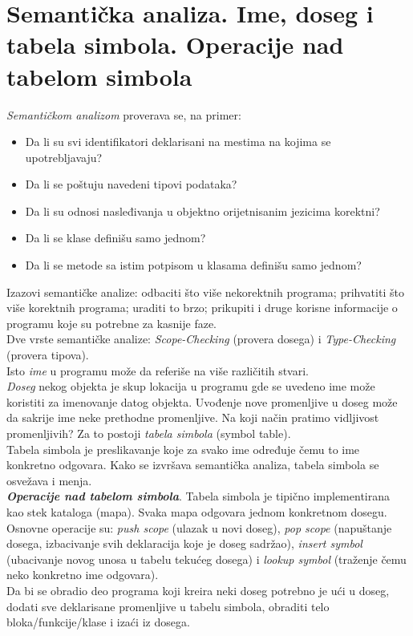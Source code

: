 \documentclass[10pt]{extarticle}
\begin{document}
\section{Semantička analiza. Ime, doseg i tabela simbola. Operacije nad tabelom simbola}
\noindent
\textit{Semantičkom analizom} proverava se, na primer:
\begin{itemize}
    \item Da li su svi identifikatori deklarisani na mestima na kojima se upotrebljavaju?
    \item Da li se poštuju navedeni tipovi podataka?
    \item Da li su odnosi nasleđivanja u objektno orijetnisanim jezicima korektni?
    \item Da li se klase definišu samo jednom?
    \item Da li se metode sa istim potpisom u klasama definišu samo jednom?
\end{itemize}
Izazovi semantičke analize: odbaciti što više nekorektnih programa; prihvatiti što više korektnih programa; uraditi to brzo; prikupiti i druge korisne informacije o programu koje su potrebne za kasnije faze. \\
Dve vrste semantičke analize: \textit{Scope-Checking} (provera dosega) i \textit{Type-Checking} (provera tipova). \\
Isto \textit{ime} u programu može da referiše na više različitih stvari. \\
\textit{Doseg} nekog objekta je skup lokacija u programu gde se uvedeno ime može koristiti za imenovanje datog objekta. Uvođenje nove promenljive u doseg može da sakrije 
ime neke prethodne promenljive. Na koji način pratimo vidljivost promenljivih?
Za to postoji \textit{tabela simbola} (symbol table). \\
Tabela simbola je preslikavanje koje za svako ime određuje čemu to ime konkretno odgovara. Kako se izvršava semantička analiza, tabela simbola se osvežava i menja. \\
\textit{\textbf{Operacije nad tabelom simbola}}. Tabela simbola je tipično implementirana kao stek kataloga (mapa). Svaka mapa odgovara jednom konkretnom dosegu. Osnovne operacije su: \textit{push scope} (ulazak u novi doseg), \textit{pop scope} (napuštanje dosega, izbacivanje svih deklaracija koje je doseg sadržao), \textit{insert symbol} (ubacivanje novog unosa u tabelu tekućeg dosega) i \textit{lookup symbol} (traženje čemu neko konkretno ime odgovara). \\
Da bi se obradio deo programa koji kreira neki doseg potrebno je ući u doseg, dodati sve deklarisane promenljive u tabelu simbola, obraditi telo bloka/funkcije/klase i izaći iz dosega.
\end{document}
